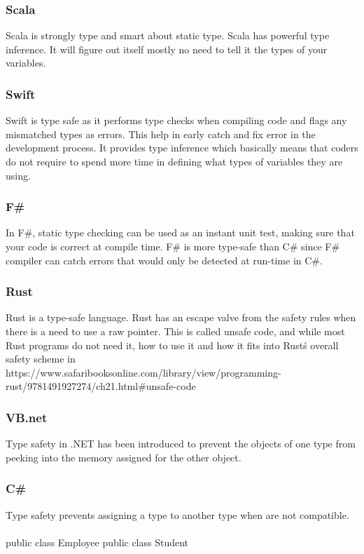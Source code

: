 \documentclass{sig-alternate}
\begin{document}
	\subsubsection{Scala}
	Scala is strongly type and smart about static type. Scala has powerful type inference. It will figure out itself mostly no need to tell it the types of your variables. 
	\subsubsection{Swift}
	Swift is type safe as it performs type checks when compiling code and flags any mismatched types as errors. This help in early catch and fix error in the development process. It provides type inference which basically means that coders do not require to spend more time in defining what types of variables they are using.
	\subsubsection{F\#}
	In F\#, static type checking can be used as an instant unit test, making sure that your code is correct at compile time. F\# is more type-safe than C\# since F\# compiler can catch errors that would only be detected at run-time in C\#.
	\subsubsection{Rust }
	Rust is a type-safe language. Rust has an escape valve from the safety rules when there is a need to use a raw pointer. This is called unsafe code, and while most Rust programs do not need it, how to use it and how it fits into Rust\'s overall safety scheme in \cite{WinNT}
	\\ https://www.safaribooksonline.com/library/view/programming-rust/9781491927274/ch21.html\#unsafe-code
	
	\subsubsection{VB.net}
	Type safety in .NET has been introduced to prevent the objects of one type from peeking into the memory assigned for the other object.
	\subsubsection{C\#}
	Type safety prevents assigning a type to another type when are not compatible.\\ \\
	public class Employee{}
	public class Student{}\\
	
\end{document}
